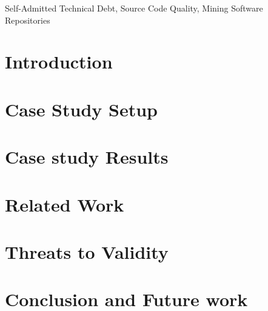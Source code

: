 \documentclass[10pt, conference]{IEEEtran}
\begin{document}
\begin{IEEEkeywords}
Self-Admitted Technical Debt, Source Code Quality, Mining Software Repositories
\end{IEEEkeywords}


\section{Introduction}
\label{sec:introduction}


\section{Case Study Setup}
\label{sec:approach}


\section{Case study Results}
\label{sec:case_study_results}


\section{Related Work}
\label{sec:related_work}



\section{Threats to Validity}
\label{sec:threats_to_validity}


\section{Conclusion and Future work}
\label{sec:conclusion}



\balance
  
\end{document}
